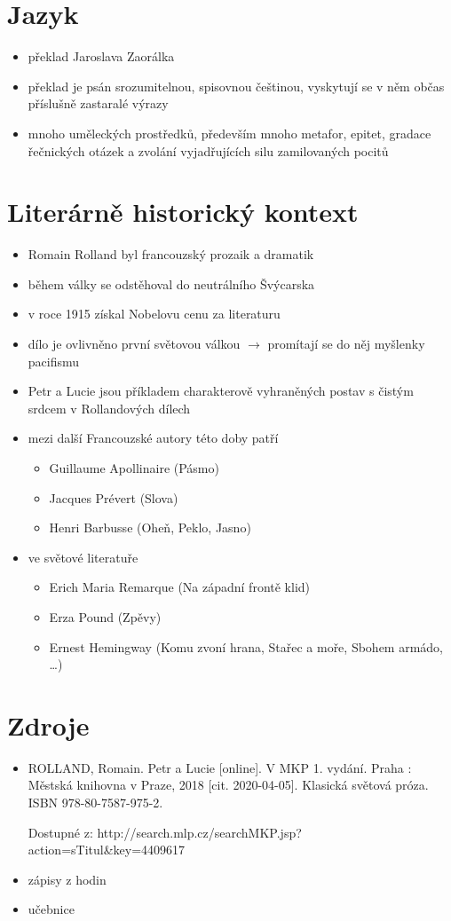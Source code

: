 \documentclass[10pt,a4paper]{article}
\newcommand{\ra}{$\rightarrow$ }
\begin{document}
\section*{Jazyk}
\begin{itemize}
\item překlad Jaroslava Zaorálka
\item překlad je psán srozumitelnou, spisovnou češtinou, vyskytují se v něm občas příslušně zastaralé výrazy
\item mnoho uměleckých prostředků, především mnoho metafor, epitet, gradace řečnických otázek a zvolání vyjadřujících silu zamilovaných pocitů
\end{itemize}
\section*{Literárně historický kontext}
\begin{itemize}
\item Romain Rolland byl francouzský prozaik a dramatik
\item během války se odstěhoval do neutrálního Švýcarska
\item v roce 1915 získal Nobelovu cenu za literaturu
\item dílo je ovlivněno první světovou válkou \ra promítají se do něj myšlenky pacifismu
\item Petr a Lucie jsou příkladem charakterově vyhraněných postav s čistým srdcem v Rollandových dílech
\item mezi další Francouzské autory této doby patří
	\begin{itemize}
	\item Guillaume Apollinaire (Pásmo)
	\item Jacques Prévert (Slova)
	\item Henri Barbusse (Oheň, Peklo, Jasno)
	\end{itemize}
\item ve světové literatuře
	\begin{itemize}
	\item Erich Maria Remarque (Na západní frontě klid)
	\item Erza Pound (Zpěvy)
	\item Ernest Hemingway (Komu zvoní hrana, Stařec a moře, Sbohem armádo, \ldots)
	\end{itemize}

\end{itemize}
\section*{Zdroje}
\begin{itemize}
\item ROLLAND, Romain. Petr a Lucie [online]. V MKP 1. vydání. Praha : Městská knihovna v Praze, 2018 [cit. 2020-04-05]. Klasická světová próza. ISBN 978-80-7587-975-2. 

Dostupné z: http://search.mlp.cz/searchMKP.jsp?action=sTitul\&key=4409617
\item zápisy z hodin
\item učebnice
\end{itemize}
\end{document}
